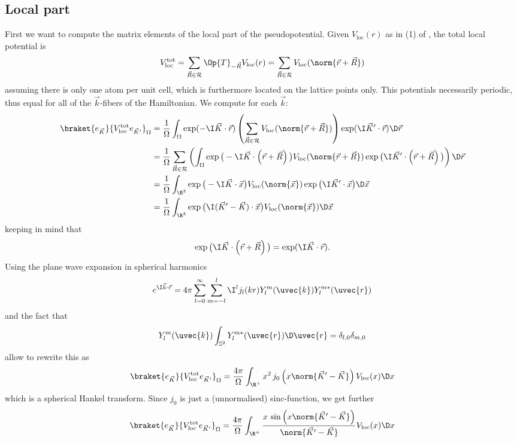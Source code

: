 \documentclass{MFHarticle}
\begin{document}
\subsection{Local part}
First we want to compute the matrix elements of the local part
of the pseudopotential.
Given $V_\text{loc}(r)$ as in (1) of \citet{Goedecker1996},
the total local potential is
\[ V_\text{loc}^\text{tot}
= \sum_{\vec{R}\in \mathcal{R}} \Op{T}_{-\vec{R}} V_\text{loc}(r)
= \sum_{\vec{R}\in \mathcal{R}} V_\text{loc}(\norm{\vec{r} + \vec{R}}) \]
assuming there is only one atom per unit cell, which is furthermore
located on the lattice points only.
This potentials necessarily periodic,
thus equal for all of the $\vec{k}$-fibers of the Hamiltonian.
We compute for each $\vec{k}$:
\begin{align*}
	\braket{e_{\vec{K}}}{V_\text{loc}^\text{tot} e_{\vec{K}'}}_\Omega
	&= \frac1{\Omega} \int_\Omega \exp(-\I \vec{K} \cdot \vec{r})
	\left(\sum_{\vec{R}\in \mathcal{R}}
	V_\text{loc}(\norm{\vec{r} + \vec{R}})\right)
	\exp(\I \vec{K}' \cdot \vec{r}) \D\vec{r} \\
	&= \frac1{\Omega} \sum_{\vec{R}\in \mathcal{R}} \left(\int_\Omega
	\exp\big(-\I \vec{K} \cdot \left(\vec{r} + \vec{R}\right) \big)
	V_\text{loc}(\norm{\vec{r} + \vec{R}})
	\exp\big(\I \vec{K}' \cdot \left(\vec{r} + \vec{R} \right)\big) \right)
	\D\vec{r} \\
	&= \frac1{\Omega} \int_{\R^3} \exp\big(-\I \vec{K} \cdot\vec{x}\big)
	V_\text{loc}(\norm{\vec{x}}) \exp\big(\I \vec{K}' \cdot \vec{x}\big) \D\vec{x} \\
	&= \frac1{\Omega} \int_{\R^3} \exp\big(\I (\vec{K}'-\vec{K}) \cdot\vec{x}\big)
	V_\text{loc}(\norm{\vec{x}}) \D\vec{x}
\end{align*}
keeping in mind that
\[ \exp\big(\I \vec{K} \cdot \left(\vec{r} + \vec{R}\right)\big) = \exp(\I \vec{K} \cdot \vec{r}). \]
Using the plane wave expansion in spherical harmonics
\[
	e^{\I \vec{k} \cdot \vec{r}} =
	4 \pi \sum_{l = 0}^\infty \sum_{m = -l}^l
	\I^l j_l(k r) Y_l^m(\uvec{k}) Y_l^{m\ast}(\uvec{r})
\]
and the fact that
\[
	Y_l^m(\uvec{k}) \int_{\mathbb{S}^2} Y_l^{m\ast}(\uvec{r}) \D \uvec{r}
		= \delta_{l,0} \delta_{m,0}
\]
allow to rewrite this as
\[
	\braket{e_{\vec{K}}}{V_\text{loc}^\text{tot} e_{\vec{K}'}}_\Omega
	= \frac{4\pi}{\Omega} \int_{\R^+}
	x^2\,  j_0\left(x \norm{\vec{K}'-\vec{K}}\right)
	V_\text{loc}(x) \D x
\]
which is a spherical Hankel transform.
Since $j_0$ is just a (unnormalised)
sinc-function, we get further
\begin{equation}
	\braket{e_{\vec{K}}}{V_\text{loc}^\text{tot} e_{\vec{K}'}}_\Omega
	= \frac{4\pi}{\Omega} \int_{\R^+}
	\frac{x\, \sin\left(x\norm{\vec{K}'-\vec{K}}\right)}
	{\norm{\vec{K}'-\vec{K}}}
	V_\text{loc}(x) \D x
	\label{eqn:Local}
\end{equation}
\end{document}
